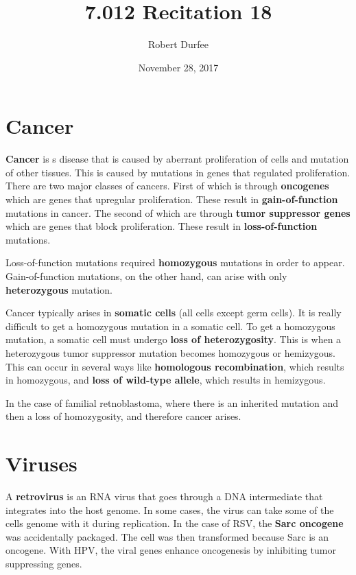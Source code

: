 \documentclass{article}
\title{ 7.012 Recitation 18 }
\author{ Robert Durfee }
\date{ November 28, 2017 }
\begin{document}
\maketitle

\section{ Cancer }

\textbf{Cancer} is s disease that is caused by aberrant proliferation of cells
and mutation of other tissues. This is caused by mutations in genes that
regulated proliferation. There are two major classes of cancers. First of which
is through \textbf{oncogenes} which are genes that upregular proliferation.
These result in \textbf{gain-of-function} mutations in cancer. The second of
which are through \textbf{tumor suppressor genes} which are genes that block
proliferation. These result in \textbf{loss-of-function} mutations. 

Loss-of-function mutations required \textbf{homozygous} mutations in order to
appear.  Gain-of-function mutations, on the other hand, can arise with only
\textbf{heterozygous} mutation.

Cancer typically arises in \textbf{somatic cells} (all cells except germ cells).
It is really difficult to get a homozygous mutation in a somatic cell. To get a
homozygous mutation, a somatic cell must undergo \textbf{loss of
heterozygosity}. This is when a heterozygous tumor suppressor mutation becomes
homozygous or hemizygous. This can occur in several ways like \textbf{homologous
recombination}, which results in homozygous, and \textbf{loss of wild-type
allele}, which results in hemizygous.

In the case of familial retnoblastoma, where there is an inherited mutation and
then a loss of homozygosity, and therefore cancer arises. 

\section{ Viruses }

A \textbf{retrovirus} is an RNA virus that goes through a DNA intermediate that
integrates into the host genome. In some cases, the virus can take some of the
cells genome with it during replication. In the case of RSV, the \textbf{Sarc
oncogene} was accidentally packaged. The cell was then transformed because Sarc
is an oncogene. With HPV, the viral genes enhance oncogenesis by inhibiting
tumor suppressing genes.
\end{document}
